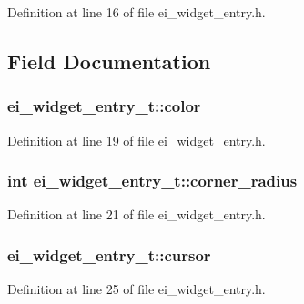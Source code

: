 Definition at line 16 of file ei\-\_\-widget\-\_\-entry.\-h.



\subsection{Field Documentation}
\hypertarget{structei__widget__entry__t_af15c8b96fc649a3d7ecc086465b73bc4}{
\subsubsection[{color}]{ ei\-\_\-widget\-\_\-entry\-\_\-t\-::color}}\label{structei__widget__entry__t_af15c8b96fc649a3d7ecc086465b73bc4}


Definition at line 19 of file ei\-\_\-widget\-\_\-entry.\-h.

\hypertarget{structei__widget__entry__t_a381053252ab90cc7ab377fc9cc1d326f}{
\subsubsection[{corner\-\_\-radius}]{\setlength{\rightskip}{0pt plus 5cm}int ei\-\_\-widget\-\_\-entry\-\_\-t\-::corner\-\_\-radius}}\label{structei__widget__entry__t_a381053252ab90cc7ab377fc9cc1d326f}


Definition at line 21 of file ei\-\_\-widget\-\_\-entry.\-h.

\hypertarget{structei__widget__entry__t_a0b69f461f2108b3a90e8b521df7e6f1f}{
\subsubsection[{cursor}]{ ei\-\_\-widget\-\_\-entry\-\_\-t\-::cursor}}\label{structei__widget__entry__t_a0b69f461f2108b3a90e8b521df7e6f1f}


Definition at line 25 of file ei\-\_\-widget\-\_\-entry.\-h.


